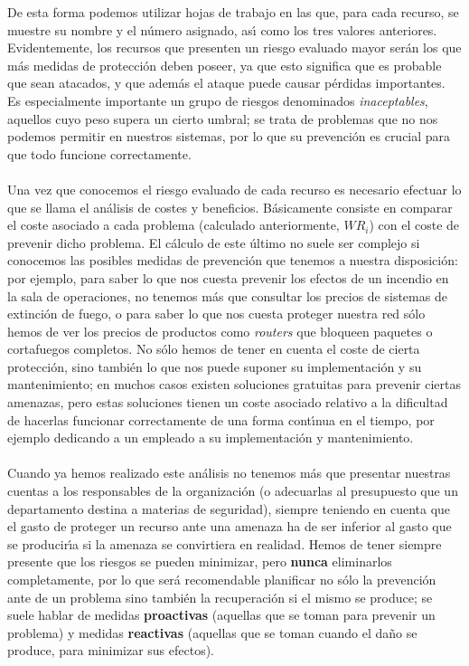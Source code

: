 De esta forma podemos utilizar hojas de trabajo en las que, para cada recurso, 
se muestre su nombre y el n\'umero asignado, as\'{\i} como los tres valores 
anteriores. Evidentemente, los recursos que presenten un riesgo evaluado mayor
ser\'an los que m\'as medidas de protecci\'on deben poseer, ya que esto 
significa que es probable que sean atacados, y que adem\'as el ataque puede
causar p\'erdidas importantes. Es especialmente importante un grupo de 
riesgos denominados {\it inaceptables}, aquellos cuyo peso supera un cierto
umbral; se trata de problemas que no nos podemos permitir en nuestros sistemas,
por lo que su prevenci\'on es crucial para que todo funcione correctamente.\\
\\Una vez que conocemos el riesgo evaluado de cada recurso es necesario 
efectuar lo que se llama el an\'alisis de costes y beneficios. B\'asicamente 
consiste en comparar el coste asociado a cada problema (calculado anteriormente,
$WR_{i}$) con el coste de prevenir dicho problema. El c\'alculo de este \'ultimo
no suele ser complejo si conocemos las posibles medidas de prevenci\'on que
tenemos a nuestra disposici\'on: por ejemplo, para saber lo que nos cuesta
prevenir los efectos de un incendio en la sala de operaciones, no tenemos m\'as
que consultar los precios de sistemas de extinci\'on de fuego, o para saber lo
que nos cuesta proteger nuestra red s\'olo hemos de ver los precios de productos
como {\it routers} que bloqueen paquetes o cortafuegos completos. No s\'olo 
hemos de tener en cuenta el coste de cierta protecci\'on, sino tambi\'en lo que
nos puede suponer su implementaci\'on y su mantenimiento; en muchos casos 
existen soluciones gratuitas para prevenir ciertas amenazas, pero estas 
soluciones tienen un coste asociado relativo a la dificultad de hacerlas
funcionar correctamente de una forma cont\'{\i}nua en el tiempo, por ejemplo 
dedicando a un empleado a su implementaci\'on y mantenimiento.\\
\\Cuando ya hemos realizado este an\'alisis no tenemos m\'as que presentar
nuestras cuentas a los responsables de la organizaci\'on (o adecuarlas al
presupuesto que un departamento destina a materias de seguridad), siempre
teniendo en cuenta que el gasto de proteger un recurso ante una amenaza ha de 
ser inferior al gasto que se producir\'{\i}a si la amenaza se convirtiera en
realidad. Hemos de tener siempre presente que los riesgos se pueden minimizar,
pero {\bf nunca} eliminarlos completamente, por lo que ser\'a recomendable
planificar no s\'olo la prevenci\'on ante de un problema sino tambi\'en la
recuperaci\'on si el mismo se produce; se suele hablar de medidas {\bf 
proactivas} (aquellas que se toman para prevenir un problema) y medidas {\bf 
reactivas} (aquellas que se toman cuando el da\~no se produce, para minimizar 
sus efectos).
